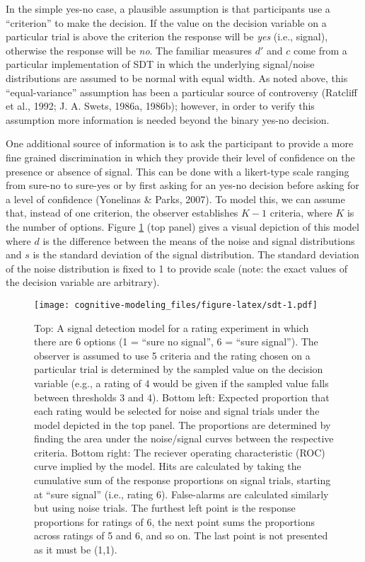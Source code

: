 \documentclass[
  english,
  ,man,floatsintext]{apa6}
\begin{document}
In the simple yes-no case, a plausible assumption is that participants use a \enquote{criterion} to make the decision. If the value on the decision variable on a particular trial is above the criterion the response will be \emph{yes} (i.e., signal), otherwise the response will be \emph{no}. The familiar measures \(d'\) and \(c\) come from a particular implementation of SDT in which the underlying signal/noise distributions are assumed to be normal with equal width. As noted above, this \enquote{equal-variance} assumption has been a particular source of controversy (Ratcliff et al., 1992; J. A. Swets, 1986a, 1986b); however, in order to verify this assumption more information is needed beyond the binary yes-no decision.

One additional source of information is to ask the participant to provide a more fine grained discrimination in which they provide their level of confidence on the presence or absence of signal. This can be done with a likert-type scale ranging from sure-no to sure-yes or by first asking for an yes-no decision before asking for a level of confidence (Yonelinas \& Parks, 2007). To model this, we can assume that, instead of one criterion, the observer establishes \(K - 1\) criteria, where \(K\) is the number of options. Figure \ref{fig:sdt} (top panel) gives a visual depiction of this model where \(d\) is the difference between the means of the noise and signal distributions and \(s\) is the standard deviation of the signal distribution. The standard deviation of the noise distribution is fixed to 1 to provide scale (note: the exact values of the decision variable are arbitrary).

\begin{figure}
\centering
\texttt{[image: cognitive-modeling\_files/figure-latex/sdt-1.pdf]}
\caption{\label{fig:sdt}Top: A signal detection model for a rating experiment in which there are 6 options (1 = \enquote{sure no signal}, 6 = \enquote{sure signal}). The observer is assumed to use 5 criteria and the rating chosen on a particular trial is determined by the sampled value on the decision variable (e.g., a rating of 4 would be given if the sampled value falls between thresholds 3 and 4). Bottom left: Expected proportion that each rating would be selected for noise and signal trials under the model depicted in the top panel. The proportions are determined by finding the area under the noise/signal curves between the respective criteria. Bottom right: The reciever operating characteristic (ROC) curve implied by the model. Hits are calculated by taking the cumulative sum of the response proportions on signal trials, starting at \enquote{sure signal} (i.e., rating 6). False-alarms are calculated similarly but using noise trials. The furthest left point is the response proportions for ratings of 6, the next point sums the proportions across ratings of 5 and 6, and so on. The last point is not presented as it must be (1,1).}
\end{figure}
\end{document}
